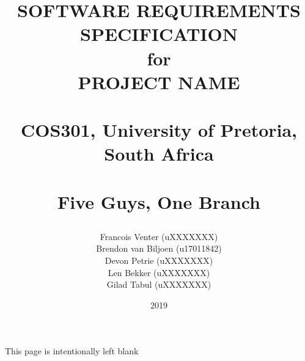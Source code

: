 \documentclass[a4paper,11pt]{book}
\title{
  \begin{flushright}
  \Huge{SOFTWARE REQUIREMENTS\\ SPECIFICATION}\\
  for\\
  PROJECT NAME\\
~\\
 \LARGE{COS301, University of Pretoria, South Africa}\\
~\\
  Five Guys, One Branch
  \end{flushright}
}
\author{
	Francois Venter (uXXXXXXX)\\ 
	Brendon van Biljoen (u17011842)\\ 
	Devon Petrie (uXXXXXXX)\\ 
	Len Bekker (uXXXXXXX)\\ 
	Gilad Tabul (uXXXXXXX)\\
}
\date{2019}
\begin{document}
\frontmatter
\maketitle
\begin{center}
	This page is intentionally left blank
\end{center}

\tableofcontents



\mainmatter

%






\end{document}
